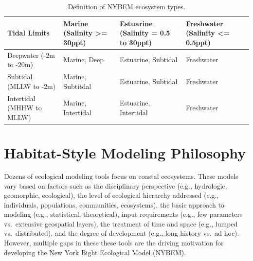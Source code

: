 \documentclass[
]{book}
\begin{document}
\begin{table}

\caption{\label{tab:unnamed-chunk-4}Definition of NYBEM ecosystem types.}
\centering
\begin{tabular}[t]{l|l|l|l}
\hline
Tidal Limits & Marine (Salinity >= 30ppt) & Estuarine (Salinity = 0.5 to 30ppt) & Freshwater (Salinity <= 0.5ppt)\\
\hline
Deepwater (-2m to -20m) & Marine, Deep & Estuarine, Subtidal & Freshwater\\
\hline
Subtidal (MLLW to -2m) & Marine, Subtitdal & Estuarine, Subtidal & Freshwater\\
\hline
Intertidal (MHHW to MLLW) & Marine, Intertidal & Estuarine, Intertidal & Freshwater\\
\hline
\end{tabular}
\end{table}

\hypertarget{habitat-style-modeling-philosophy}{%
\section{Habitat-Style Modeling Philosophy}\label{habitat-style-modeling-philosophy}}

Dozens of ecological modeling tools focus on coastal ecosystems. These models vary based on factors such as the disciplinary perspective (e.g., hydrologic, geomorphic, ecological), the level of ecological hierarchy addressed (e.g., individuals, populations, communities, ecosystems), the basic approach to modeling (e.g., statistical, theoretical), input requirements (e.g., few parameters vs.~extensive geospatial layers), the treatment of time and space (e.g., lumped vs.~distributed), and the degree of development (e.g., long history vs.~ad hoc). However, multiple gaps in these these tools are the driving motivation for developing the New York Bight Ecological Model (NYBEM).
\end{document}
